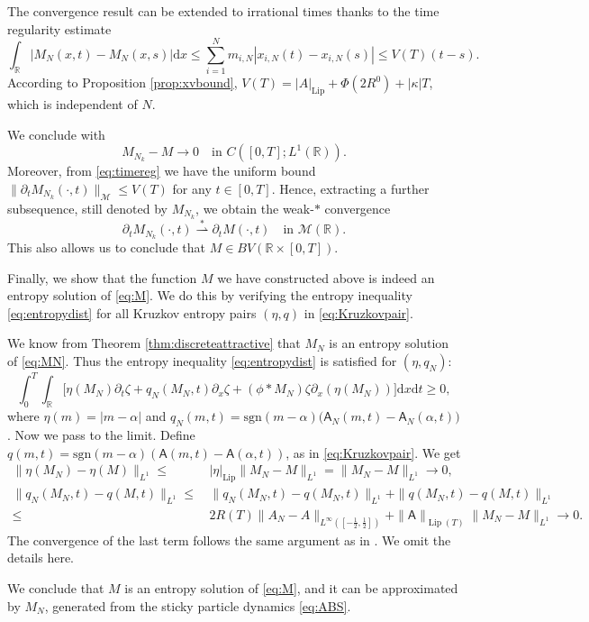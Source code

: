 \documentclass[11pt,reqno]{amsart}
\theoremstyle{definition}
\theoremstyle{remark}
\def\R{\mathbb{R}}
\def\dd{\mathrm{d}}
\def\pa{\partial}
\def\A{\mathsf{A}}
\newcommand{\sgn}[1]{\mathrm{sgn}(#1)}
\DeclareMathOperator{\Lip}{Lip}
\def\a{\alpha}
\begin{document}
	The convergence result can be extended to irrational times thanks to the time regularity estimate
	\begin{equation}\label{eq:timereg}
		\int_\R |M_N(x,t) - M_N(x,s)|\dd x \le \sum_{i=1}^Nm_{i,N}|x_{i,N}(t)-x_{i,N}(s)| \le V(T)(t-s).
	\end{equation}
	According to Proposition \ref{prop:xvbound}, $V(T) = |A|_{\Lip} +  \Phi(2R^0) + |\kappa| T$, which is independent of $N$.
	
	We conclude with 
	\[
	M_{N_k}-M\to 0\quad \text{in}\,\, C([0,T];L^1(\R)).
	\]
	Moreover, from \eqref{eq:timereg} we have the uniform bound $\|\pa_tM_{N_k}(\cdot,t)\|_{\mathcal{M}}\leq V(T)$ for any $t\in[0,T]$. Hence, extracting a further subsequence, still denoted by $M_{N_k}$, we obtain the weak-$*$ convergence
	\[\pa_tM_{N_k}(\cdot,t)\stackrel{*}{\rightharpoonup}  \pa_tM(\cdot,t)\quad \text{in}\,\, \mathcal{M}(\R).\] 
	This also allows us to conclude that $M\in BV(\R\times[0,T])$.
	
	Finally, we show that the function $M$ we have constructed above is indeed an entropy solution of \eqref{eq:M}.  We do this by verifying the entropy inequality \eqref{eq:entropydist} for all Kruzkov entropy pairs $(\eta, q)$ in \eqref{eq:Kruzkovpair}.
	
	We know from Theorem \ref{thm:discreteattractive} that $M_N$ is an entropy solution of \eqref{eq:MN}. Thus the entropy inequality \eqref{eq:entropydist} is satisfied for $(\eta, q_N)$:
	\[
	\int_0^{T} \int_\R \Big[\eta(M_N) \pa_t \zeta + q_N(M_N,t)\pa_x \zeta +
	(\phi\ast M_N)\zeta \pa_x(\eta(M_N)) \Big] \dd x \dd t
	\ge 0,
	\]
	where $\eta(m)=|m-\a|$ and $q_N(m,t) = \sgn{m - \alpha}\big(\A_N(m,t) - \A_N(\alpha,t)\big)$.
	Now we pass to the limit. Define $q(m,t) = \sgn{m-\a}(\A(m,t) -
	\A(\alpha,t))$, as in \eqref{eq:Kruzkovpair}. We get
	\begin{align*}
		\|\eta(M_N)-\eta(M)\|_{L^1}\leq
		&\,|\eta|_{\Lip}\|M_N-M\|_{L^1}=\|M_N-M\|_{L^1}\to0,\\
		\|q_N(M_N,t)-q(M,t)\|_{L^1}\leq &\,\|q_N(M_N,t)-q(M_N,t)\|_{L^1}+\|q(M_N,t)-q(M,t)\|_{L^1}\\
		\leq &\, 2R(T)\|A_N-A\|_{L^\infty([-\frac12,\frac12])}+\|\A\|_{\Lip(T)}\|M_N-M\|_{L^1}\to0.
	\end{align*}
	The convergence of the last term follows the same argument as in \cite{leslie2023sticky}. We omit the details here.
	
	We conclude that $M$ is an entropy solution of \eqref{eq:M}, and it can be approximated by $M_N$, generated from the sticky particle dynamics \eqref{eq:ABS}. %
	
\end{document}

